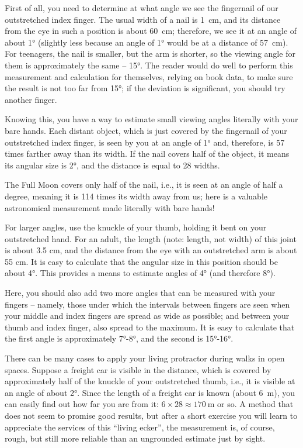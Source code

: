 First of all, you need to determine at what angle we see the fingernail of our outstretched index finger. The usual width of a nail is \SI{1}{\centi\meter}, and its distance from the eye in such a position is about \SI{60}{\centi\meter}; therefore, we see it at an angle of about \ang{1} (slightly less because an angle of \ang{1} would be at a distance of \SI{57}{\centi\meter}). For teenagers, the nail is smaller, but the arm is shorter, so the viewing angle for them is approximately the same -- \ang{15}. The reader would do well to perform this measurement and calculation for themselves, relying on book data, to make sure the result is not too far from \ang{15}; if the deviation is significant, you should try another finger.

Knowing this, you have a way to estimate small viewing angles literally with your bare hands. Each distant object, which is just covered by the fingernail of your outstretched index finger, is seen by you at an angle of \ang{1} and, therefore, is 57 times farther away than its width. If the nail covers half of the object, it means its angular size is \ang{2}, and the distance is equal to 28 widths.

The Full Moon covers only half of the nail, i.e., it is seen at an angle of half a degree, meaning it is 114 times its width away from us; here is a valuable astronomical measurement made literally with bare hands!

For larger angles, use the knuckle of your thumb, holding it bent on your outstretched hand. For an adult, the length (note: length, not width) of this joint is about 3.5 cm, and the distance from the eye with an outstretched arm is about 55 cm. It is easy to calculate that the angular size in this position should be about \ang{4}. This provides a means to estimate angles of \ang{4} (and therefore \ang{8}).

Here, you should also add two more angles that can be measured with your fingers -- namely, those under which the intervals between fingers are seen when your middle and index fingers are spread as wide as possible; and between your thumb and index finger, also spread to the maximum. It is easy to calculate that the first angle is approximately \ang{7}-\ang{8}, and the second is \ang{15}-\ang{16}.

There can be many cases to apply your living protractor during walks in open spaces. Suppose a freight car is visible in the distance, which is covered by approximately half of the knuckle of your outstretched thumb, i.e., it is visible at an angle of about \ang{2}. Since the length of a freight car is known (about \SI{6}{\meter}), you can easily find out how far you are from it: $6 \times 28 \approx \SI{170}{\meter}$ or so. A method that does not seem to promise good results, but after a short exercise you will learn to appreciate the services of this ``living ecker'', the measurement is, of course, rough, but still more reliable than an ungrounded estimate just by sight.

